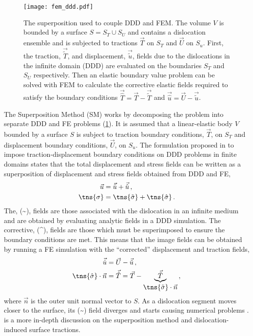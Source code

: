 \begin{figure}
  \centering
  \texttt{[image: fem\_ddd.pdf]}
  \caption[Superposition Method for DDD-FEM coupling.]{The superposition used to couple DDD and FEM. The volume $V$ is bounded by a surface $S = S_{T} \cup S_{U}$ and contains a dislocation ensemble and is subjected to tractions $\vec{T}$ on $S_{T}$ and $\vec{U}$ on $S_{u}$. First, the traction, $\vec{\tilde{T}}$, and displacement, $\vec{\tilde{u}}$, fields due to the dislocations in the infinite domain (DDD) are evaluated on the boundaries $S_{T}$ and $S_{U}$ respectively. Then an elastic boundary value problem can be solved with FEM to calculate the corrective elastic fields required to satisfy the boundary conditions $\vec{\hat{T}} = \vec{T} - \vec{\tilde{T}}$ and $\vec{\hat{u}} = \vec{U} - \vec{\tilde{u}}$.}
  \label{f:fem_ddd}
\end{figure}

The Superposition Method (SM) works by decomposing the problem into separate DDD and FE problems (\cref{f:fem_ddd}). It is assumed that a linear-elastic body $ V $ bounded by a surface $ S $ is subject to traction boundary conditions, $ \vec{T} $, on $ S_{T} $ and displacement boundary conditions, $ \vec{U} $, on $ S_{u} $. The formulation proposed in \cite{dismot} to impose traction-displacement boundary conditions on DDD problems in finite domains states that the total displacement and stress fields can be written as a superposition of displacement and stress fields obtained from DDD and FE,
\begin{subequations}
  \label{eq:superposition}
  \begin{align}
    \vec{u}      & = \vec{\tilde{u}} + \vec{\hat{u}}\,,            \\
    \tns{\sigma} & = \tns{\tilde{\sigma}} + \tns{\hat{\sigma}}\, .
  \end{align}
\end{subequations}
The, (\textasciitilde), fields are those associated with the dislocation in an infinite medium and are obtained by evaluating analytic fields in a DDD simulation. The corrective, (\textasciicircum), fields are those which must be superimposed to ensure the boundary conditions are met. This means that the image fields can be obtained by running a FE simulation with the ``corrected'' displacement and traction fields,
\begin{subequations}
  \begin{align}
    \vec{\hat{u}}                    & = \vec{U} - \vec{\tilde{u}}\,,                                                                                 \\
    \tns{\hat{\sigma}} \cdot \vec{n} & = \vec{\hat{T}} = \vec{T} - \underbrace{\vec{\tilde{T}}}_{\displaystyle{\tns{\tilde{\sigma}}}\cdot \vec{n}}\,,
  \end{align}
\end{subequations}
where $ \vec{n} $ is the outer unit normal vector to $ S $. As a dislocation segment moves closer to the surface, its (\textasciitilde) field diverges and starts causing numerical problems \cite{bdd}.  is a more in-depth discussion on the superposition method and dislocation-induced surface tractions.

